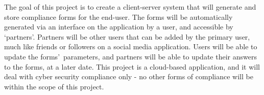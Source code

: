         The goal of this project is to create a client-server system that will generate and store compliance forms for the end-user. The forms will be automatically generated via an interface on the application by a user, and accessible by \textquoteleft partners\textquoteright. Partners will be other users that can be added by the primary user, much like friends or followers on a social media application. Users will be able to update the forms\textquoteright\ parameters, and partners will be able to update their answers to the forms, at a later date. This project is a cloud-based application, and it will deal with cyber security compliance only - no other forms of compliance will be within the scope of this project.